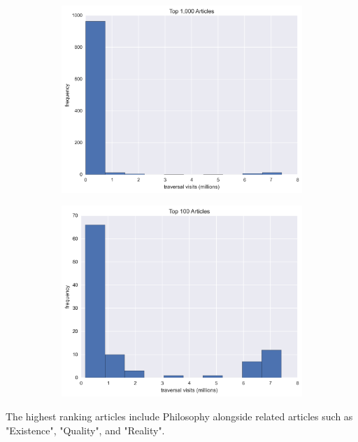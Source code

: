 \documentclass[twoside]{article}
\begin{document}
\begin{figure}[H]
\centering
\caption{traversal visit distribution of highest ranking articles}
\begin{subfigure}{.5\textwidth}
  \centering
  \includegraphics[width=.9\linewidth]{graphics/top_1k_article_traversals.png}
\end{subfigure}%
\begin{subfigure}{.5\textwidth}
  \centering
  \includegraphics[width=.9\linewidth]{graphics/top_100_article_traversals.png}
\end{subfigure}
\end{figure}


The highest ranking articles include Philosophy alongside related articles such as "Existence", "Quality", and "Reality".
\end{document}
